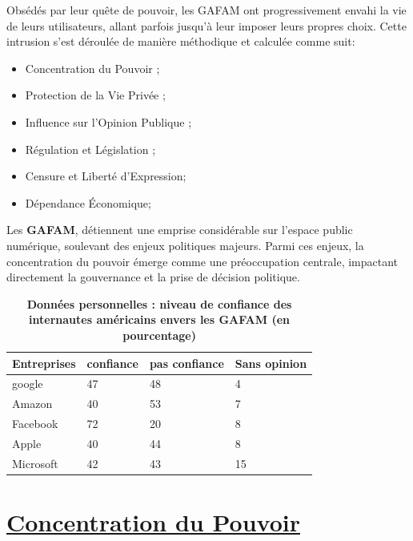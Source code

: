 \documentclass[12pt,a4paper]{article} %
\begin{document}
	Obsédés par leur quête de pouvoir, les GAFAM ont progressivement envahi la vie de leurs utilisateurs, allant parfois jusqu'à leur imposer leurs propres choix. Cette intrusion s'est déroulée de manière méthodique et calculée comme suit:
	\begin{itemize}
		\item Concentration du Pouvoir ;
		\item Protection de la Vie Privée ;
		\item Influence sur l'Opinion Publique ;
		\item Régulation et Législation ;
		\item Censure et Liberté d'Expression;
		\item Dépendance Économique;
		
	\end{itemize}
	

	Les \textbf{GAFAM}, détiennent une emprise considérable sur l'espace public numérique, soulevant des enjeux politiques majeurs. Parmi ces enjeux, la concentration du pouvoir émerge comme une préoccupation centrale, impactant directement la gouvernance et la prise de décision politique.
	
		\begin{table}[h]
		
		\begin{tabular}{|l|l|l|l|}
			\hline
			\textbf{Entreprises} & \textbf{confiance}&\textbf{pas confiance}&\textbf{Sans opinion} \\
			\hline
			google & 47 & 48 & 4 \\
			\hline
			Amazon & 40 & 53 & 7 \\
			\hline
			Facebook & 72 & 20 & 8 \\
			\hline
			Apple & 40 & 44 & 8 \\
			\hline
			Microsoft & 42 & 43 & 15 \\
			\hline
			
		\end{tabular}
		
		\caption{\textbf{Données personnelles : niveau de confiance des internautes américains envers les GAFAM (en pourcentage)}}
		\label{}
		
	\end{table}
	
	\section{\underline{Concentration du Pouvoir}}
	
\end{document}
